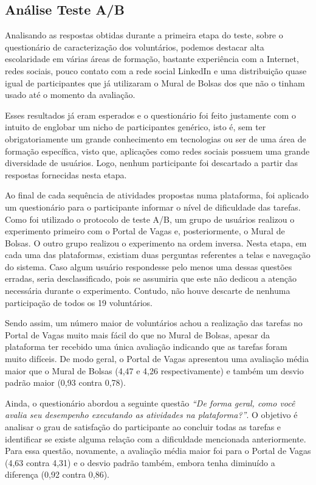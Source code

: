\subsection{Análise Teste A/B}
\label {avaliacaoAnaliseSubjetiva}

Analisando as respostas obtidas durante a primeira etapa do teste, sobre o questionário de caracterização dos voluntários, podemos destacar alta escolaridade em várias áreas de formação, bastante experiência com a Internet, redes sociais, pouco contato com a rede social LinkedIn e uma distribuição quase igual de participantes que já utilizaram o Mural de Bolsas dos que não o tinham usado até o momento da avaliação. 

Esses resultados já eram esperados e o questionário foi feito justamente com o intuito de englobar um nicho de participantes genérico, isto é, sem ter obrigatoriamente um grande conhecimento em tecnologias ou ser de uma área de formação específica, visto que, aplicações como redes sociais possuem uma grande diversidade de usuários. Logo, nenhum participante foi descartado a partir das respostas fornecidas nesta etapa.

Ao final de cada sequência de atividades propostas numa plataforma, foi aplicado um questionário para o participante informar o nível de dificuldade das tarefas. Como foi utilizado o protocolo de teste A/B, um grupo de usuários realizou o experimento primeiro com o Portal de Vagas e, posteriormente, o Mural de Bolsas. O outro grupo realizou o experimento na ordem inversa. Nesta etapa, em cada uma das plataformas, existiam duas perguntas referentes a telas e navegação do sistema. Caso algum usuário respondesse pelo menos uma dessas questões erradas, seria desclassificado, pois se assumiria que este não dedicou a atenção necessária durante o experimento. Contudo, não houve descarte de nenhuma participação de todos os 19 voluntários.

Sendo assim, um número maior de voluntários achou a realização das tarefas no Portal de Vagas muito mais fácil do que no Mural de Bolsas, apesar da plataforma ter recebido uma única avaliação indicando que as tarefas foram muito difíceis. De modo geral, o Portal de Vagas apresentou uma avaliação média maior que o Mural de Bolsas (4,47 e 4,26 respectivamente) e também um desvio padrão maior (0,93 contra 0,78).

Ainda, o questionário abordou a seguinte questão \textit{“De forma geral, como você avalia seu desempenho executando as atividades na plataforma?”}. O objetivo é analisar o grau de satisfação do participante ao concluir todas as tarefas e identificar se existe alguma relação com a dificuldade mencionada anteriormente. Para essa questão, novamente, a avaliação média maior foi para o Portal de Vagas (4,63 contra 4,31) e o desvio padrão também, embora tenha diminuído a diferença (0,92 contra 0,86).

